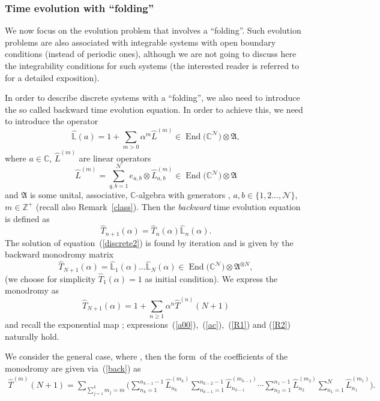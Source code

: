 \documentclass[pdftex]{sigma}
\numberwithin{equation}{section}
\theoremstyle{definition}
\DeclareMathOperator{\EEnd}{End}%
\begin{document}
\subsubsection{Time evolution with ``folding''}
We now focus on the evolution problem that involves a ``folding''. Such evolution problems are also associated with integrable systems with open boundary conditions (instead of periodic ones), although we are not going to discuss here the integrability conditions for such systems (the interested reader is referred to~\cite{Sklyanin, Sklyaninb} for a detailed exposition).


In order to describe discrete systems with a ``folding'', we also need to introduce the so called backward time evolution equation. In order to achieve this, we need to introduce the operator
\[
\hat {\mathbb L}(a)= 1 + \sum_{m>0} \alpha^m \hat L^{(m)} \in \EEnd\bigl({\mathbb C}^{\mathcal N}\bigr) \otimes {\mathfrak A},
\]
where $a\in {\mathbb C}$, $\hat L^{(m)}$ are linear operators
\[
\hat L^{(m)} = \sum_{q,b =1}^{{\mathcal N}} e_{a,b} \otimes \hat L_{a,b}^{(m)} \in \EEnd\bigl({\mathbb C}^{\mathcal N}\bigr) \otimes {\mathfrak A}
\]
 and ${\mathfrak A}$ is some unital, associative, ${\mathbb C}$-algebra with generators , $a,b \in \{1,2 \dots ,{\mathcal N}\}$, $m \in {\mathbb Z}^+$ (recall also Remark~\ref{class}).
Then the {\it backward} time evolution equation is defined as
\begin{equation}
\hat T_{n+1}(\alpha) = \hat T_{n}(\alpha) \hat {\mathbb L}_n(\alpha). \label{discrete2}
\end{equation}
The solution of equation~(\ref{discrete2}) is found by iteration and is given by the backward monodromy matrix
\begin{equation}
\hat T_{N+1}(\alpha) = \hat {\mathbb L}_{1}(\alpha) \dots \hat {\mathbb L}_{N}(\alpha) \in \EEnd\bigl({\mathbb C}^{\mathcal N}\bigr) \otimes {\mathfrak A}^{\otimes N}, \label{back}
\end{equation}
(we choose for simplicity $\hat T_1(\alpha) = 1$ as initial condition).
We express the monodromy as
\[
\hat T_{N+1}(\alpha)=1 + \sum_{n\geq 1} \alpha^n \hat T^{(n)}(N+1)
\]
and recall the exponential map
;
{expressions}~(\ref{a00}),~(\ref{ac}),~(\ref{R1}) and (\ref{R2}) naturally hold.

We consider the general case, where , then the form~of the coefficients of the monodromy  are given via~(\ref{back}) as
\begin{gather}
\hat T^{(m)}(N+1)= \sum_{\sum_{j=1}^km_j=m}\Biggl( \sum_{n_{k}=1}^{n_{k-1}-1 }\hat L_{n_k}^{(m_k)} \sum_{n_{k-1}=1}^{n_{k-2}-1 }\hat L^{(m_{k-1})}_{n_{k-1}} \cdots \sum_{n_{2}=1}^{n_1-1 }\hat L^{(m_2)}_{n_2}\sum_{n_1=1}^N \hat L^{(m_1)}_{n_1}\Biggr). \label{tt2b}
\end{gather}
\end{document}
